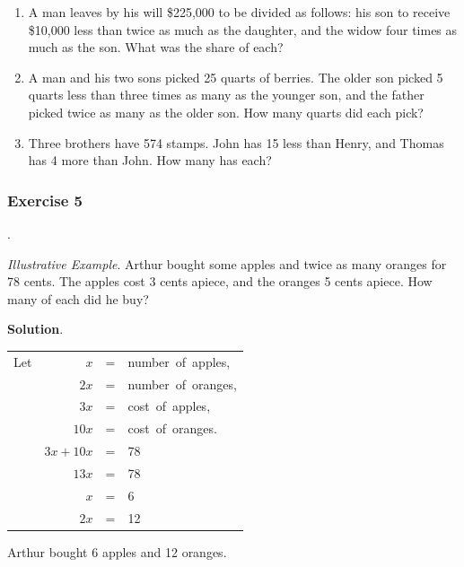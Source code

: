 \documentclass{book}
\begin{document}
\begin{enumerate}
\item A man leaves by his will \$225,000 to be divided
as follows: his son to receive \$10,000 less than twice as
much as the daughter, and the widow four times as much
as the son. What was the share of each?

\item A man and his two sons picked 25 quarts of berries.
The older son picked 5 quarts less than three times as
many as the younger son, and the father picked twice as
many as the older son. How many quarts did each pick?

\item Three brothers have 574 stamps. John has 15 less than Henry,
and Thomas has 4 more than John. How many has each?
\end{enumerate}

\subsubsection*{Exercise 5}.

\textit{ Illustrative Example}. Arthur bought some apples and
twice as many oranges for 78 cents. The apples cost 3 cents
apiece, and the oranges 5 cents apiece. How many of each did he
buy?

\begin{center}
\textbf{ Solution}.
\end{center}
\begin{center}
\begin{tabular}{l r c l}
Let & $x$ &=& \mbox{number of apples}, \\
& $2x$ &=& \mbox{number of oranges},\\
& $3x$ &=& \mbox{cost of apples},\\
& $10x$ &=& \mbox{cost of oranges}.\\
& $3x + 10x $&=& 78\\
& $13x$ &=& 78\\
& $x$ &=& 6\\
& $2x$ &=& 12\\
\end{tabular}
\end{center}

Arthur bought 6 apples and 12 oranges.
\end{document}
